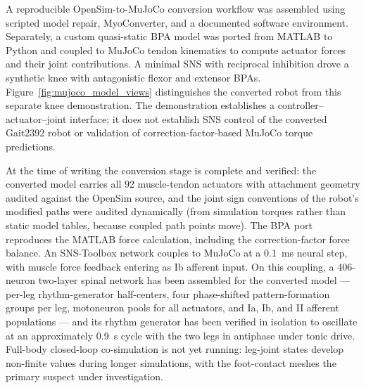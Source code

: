 A reproducible OpenSim-to-MuJoCo conversion workflow was assembled using scripted model repair, MyoConverter, and a documented software environment. Separately, a custom quasi-static BPA model was ported from MATLAB to Python and coupled to MuJoCo tendon kinematics to compute actuator forces and their joint contributions. A minimal SNS with reciprocal inhibition drove a synthetic knee with antagonistic flexor and extensor BPAs. Figure~\ref{fig:mujoco_model_views} distinguishes the converted robot from this separate knee demonstration. The demonstration establishes a controller--actuator--joint interface; it does not establish SNS control of the converted Gait2392 robot or validation of correction-factor-based MuJoCo torque predictions.

At the time of writing the conversion stage is complete and verified: the converted model carries all 92 muscle-tendon actuators with attachment geometry audited against the OpenSim source, and the joint sign conventions of the robot's modified paths were audited dynamically (from simulation torques rather than static model tables, because coupled path points move). The BPA port reproduces the MATLAB force calculation, including the correction-factor force balance. An SNS-Toolbox network couples to MuJoCo at a \qty{0.1}{\milli\second} neural step, with muscle force feedback entering as Ib afferent input. On this coupling, a 406-neuron two-layer spinal network has been assembled for the converted model --- per-leg rhythm-generator half-centers, four phase-shifted pattern-formation groups per leg, motoneuron pools for all actuators, and Ia, Ib, and II afferent populations --- and its rhythm generator has been verified in isolation to oscillate at an approximately \qty{0.9}{\second} cycle with the two legs in antiphase under tonic drive. Full-body closed-loop co-simulation is not yet running: leg-joint states develop non-finite values during longer simulations, with the foot-contact meshes the primary suspect under investigation.

